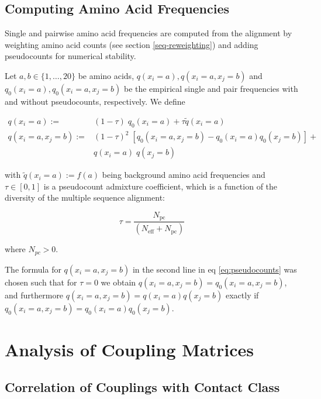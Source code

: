 \documentclass[12pt,a4paper,twoside]{book}
\newcommand{\eq}{\!=\!}
\theoremstyle{definition}
\theoremstyle{definition}
\theoremstyle{remark}
\begin{document}
\subsection{Computing Amino Acid
Frequencies}\label{amino-acid-frequencies}

Single and pairwise amino acid frequencies are computed from the
alignment by weighting amino acid counts (see section
\ref{seq-reweighting}) and adding pseudocounts for numerical stability.

Let \(a,b \in \{1,\ldots,20\}\) be amino acids,
\(q(x_i=a), q(x_i=a, x_j=b)\) and \(q_0(x_i=a), q_0(x_i=a,x_j=b)\) be
the empirical single and pair frequencies with and without pseudocounts,
respectively. We define

\begin{align}
    q(x_i \eq a) :=& (1-\tau) \;  q_0(x_i \eq a) + \tau \tilde{q}(x_i\eq a) \\
    q(x_i \eq a, x_j \eq b) :=& (1-\tau)^2  \; [ q_0(x_i \eq a, x_j \eq b) - q_0(x_i \eq a)  q_0(x_j \eq b) ] + \\
                            & q(x_i \eq a) \; q(x_j \eq b) 
\label{eq:pseudocounts}
\end{align}

with \(\tilde{q}(x_i \eq a) := f(a)\) being background amino acid
frequencies and \(\tau \in [0,1]\) is a pseudocount admixture
coefficient, which is a function of the diversity of the multiple
sequence alignment:

\begin{equation}
    \tau = \frac{N_\mathrm{pc}}{(N_\mathrm{eff} + N_\mathrm{pc})}
\label{eq:tau}
\end{equation}

where \(N_{pc} > 0\).

The formula for \(q(x_i \eq a, x_j \eq b)\) in the second line in eq
\eqref{eq:pseudocounts} was chosen such that for \(\tau \eq0\) we obtain
\(q(x_i \eq a, x_j \eq b) = q_0(x_i \eq a, x_j \eq b)\), and furthermore
\(q(x_i \eq a, x_j \eq b) = q(x_i \eq a) q(x_j \eq b)\) exactly if
\(q_0(x_i \eq a, x_j \eq b) = q_0(x_i \eq a) q_0(x_j \eq b)\).

\section{Analysis of Coupling
Matrices}\label{analysis-of-coupling-matrices}

\subsection{Correlation of Couplings with Contact
Class}\label{method-coupling-correlation}
\end{document}
